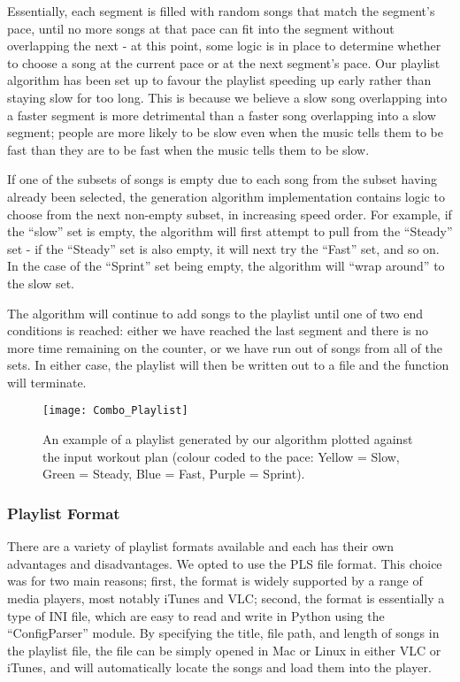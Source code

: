 \documentclass{article}
\begin{document}
Essentially, each segment is filled with random songs that match the segment's pace, until no more songs at that pace can fit into the segment without overlapping the next - at this point, some logic is in place to determine whether to choose a song at the current pace or at the next segment's pace. Our playlist algorithm has been set up to favour the playlist speeding up early rather than staying slow for too long. This is because we believe a slow song overlapping into a faster segment is more detrimental than a faster song overlapping into a slow segment; people are more likely to be slow even when the music tells them to be fast than they are to be fast when the music tells them to be slow.

If one of the subsets of songs is empty due to each song from the subset having already been selected, the generation algorithm implementation contains logic to choose from the next non-empty subset, in increasing speed order. For example, if the ``slow'' set is empty, the algorithm will first attempt to pull from the ``Steady'' set - if the ``Steady'' set is also empty, it will next try the ``Fast'' set, and so on. In the case of the ``Sprint'' set being empty, the algorithm will ``wrap around'' to the slow set.

The algorithm will continue to add songs to the playlist until one of two end conditions is reached: either we have reached the last segment and there is no more time remaining on the counter, or we have run out of songs from all of the sets. In either case, the playlist will then be written out to a file and the function will terminate.

\begin{figure}[h]
\centering
\captionsetup{justification=centering}
\texttt{[image: Combo\_Playlist]}
\caption{An example of a playlist generated by our algorithm plotted against the input workout plan (colour coded to the pace: Yellow = Slow, Green = Steady, Blue = Fast, Purple = Sprint).}
\label{fig:playlist}
\end{figure}

\subsubsection{Playlist Format}

There are a variety of playlist formats available \cite{Gonze} and each has their own advantages and disadvantages. We opted to use the PLS file format. This choice was for two main reasons; first, the format is widely supported by a range of media players, most notably iTunes and VLC; second, the format is essentially a type of INI file, which are easy to read and write in Python using the ``ConfigParser'' module. By specifying the title, file path, and length of songs in the playlist file, the file can be simply opened in Mac or Linux in either VLC or iTunes, and will automatically locate the songs and load them into the player.
\end{document}
